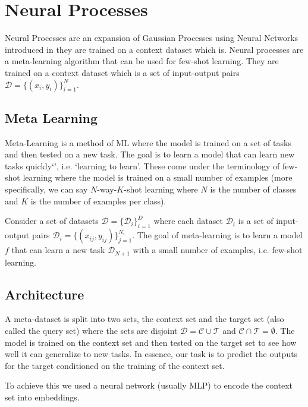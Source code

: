 \documentclass[main.tex]{subfiles}
\begin{document}
\section{Neural Processes}

Neural Processes are an expansion of Gaussian Processes using Neural Networks introduced in \cite{garnelo2018neural} they are trained on a context dataset which is. Neural processes are a meta-learning algorithm that can be used for few-shot learning. They are trained on a context dataset which is a set of input-output pairs $\mathcal{D} = \{ (x_i, y_i) \}_{i=1}^N$. 

\subsection{Meta Learning}

Meta-Learning is a method of ML where the model is trained on a set of tasks and then tested on a new task. The goal is to learn a model that can learn new tasks quickly`', i.e. `learning to learn'. These come under the terminology of few-shot learning where the model is trained on a small number of examples (more specifically, we can say $N$-way-$K$-shot learning where $N$ is the number of classes and $K$ is the number of examples per class).

Consider a set of datasets $\mathcal{D} = \{ \mathcal{D}_i \}_{i=1}^D$ where each dataset $\mathcal{D}_i$ is a set of input-output pairs $\mathcal{D}_i = \{ (x_{ij}, y_{ij}) \}_{j=1}^{N_i}$. The goal of meta-learning is to learn a model $f$ that can learn a new task $\mathcal{D}_{N+1}$ with a small number of examples, i.e. few-shot learning.

\subsection{Architecture}

A meta-dataset is split into two sets, the context set and the target set (also called the query set) where the sets are disjoint $\mathcal{D} = \mathcal{C} \cup \mathcal{T}$ and $\mathcal{C} \cap \mathcal{T} = \emptyset$. The model is trained on the context set and then tested on the target set to see how well it can generalize to new tasks. In essence, our task is to predict the outputs for the target conditioned on the training of the context set.

To achieve this we used a neural network (usually MLP) to encode the context set into embeddings. 
\end{document}
